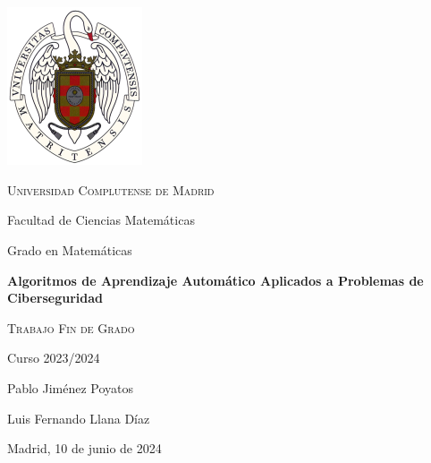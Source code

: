 \documentclass[11pt, a4paper]{article} %
\begin{document}
\begin{titlepage}
    \centering
    \vspace*{1.7cm}
    \includegraphics[width=0.3\textwidth]{logo_UCM.png}\par
    \vspace{1cm}

    {\LARGE \textsc{Universidad Complutense de Madrid}\par}
    \vspace{0.5cm}
    {\large Facultad de Ciencias Matemáticas\par}
    \vspace{0.5cm}
    {\large Grado en Matemáticas\par}
    \vfill

    {\LARGE \textbf{Algoritmos de Aprendizaje Automático Aplicados a Problemas de Ciberseguridad}\par}
    \vspace{1.3cm}
    {\LARGE \textsc{Trabajo Fin de Grado}\par}
    \vspace{1.1cm}
    {\Large Curso 2023/2024\par}
    \vfill

    \begin{minipage}{0.9\textwidth}
        \begin{flushleft}
            Pablo Jiménez Poyatos
        \end{flushleft}
    \end{minipage}
    
    \vspace{0.5cm}
    
    \begin{minipage}{0.9\textwidth}
        \begin{flushleft}
            Luis Fernando Llana Díaz
        \end{flushleft}
    \end{minipage}

    \vfill
    \vfill
    \vfill

	\begin{flushright}
            Madrid, 10 de junio de 2024
    \end{flushright}
    
\end{titlepage}
\end{document}
